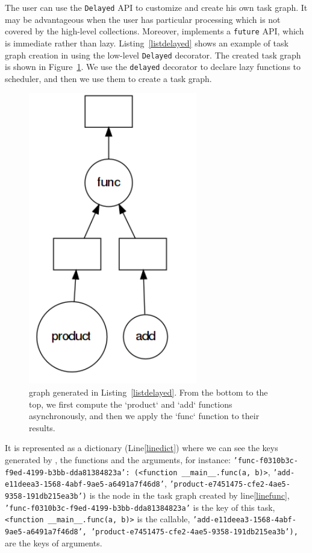 The user can use the \texttt{Delayed} API to customize and create his own task graph. It may be advantageous when the user has particular processing which is not covered by the high-level collections. 
Moreover, \dask implements a \texttt{future} API, which is immediate rather than lazy. 
Listing~\ref{listdelayed} shows an example of task graph creation in \dask using the low-level \texttt{Delayed} decorator. The created task graph is shown in Figure~\ref{figfunc}. 
We use the \texttt{delayed} decorator to declare lazy functions to \dask scheduler, and then we use them to create a task graph. 

\begin{figure}[p]\centering
\includegraphics[scale=0.5]{figures/func.png}
\caption{\dask graph generated in Listing~\ref{listdelayed}. From the bottom to the top, we first compute the `product` and `add` functions asynchronously, and then we apply the `func` function to their results.}
\label{figfunc}
\end{figure}

It is represented as a dictionary (Line\ref{linedict}) where we can see the keys generated by \dask, the functions and the arguments, for instance: \texttt{'func-f0310b3c-f9ed-4199-b3bb-dda81384823a': (<function \_\_main\_\_.func(a, b)>}, \texttt{'add-e11deea3-1568-4abf-9ae5-a6491a7f46d8'}, \texttt{'product-e7451475-cfe2-4ae5-9358-191db215ea3b')} is the node in the task graph created by line\ref{linefunc}, \texttt{'func-f0310b3c-f9ed-4199-b3bb-dda81384823a'} is the key of this task, \texttt{<function \_\_main\_\_.func(a, b)>} is the callable, \texttt{'add-e11deea3-1568-4abf-9ae5-a6491a7f46d8',
  'product-e7451475-cfe2-4ae5-9358-191db215ea3b'),} are the keys of arguments. 
  


